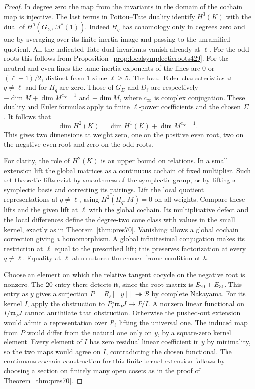 \documentclass[a4paper,11pt]{article}
\theoremstyle{definition}
\theoremstyle{remark}
\numberwithin{equation}{section}
\begin{document}
\begin{proof}
In degree zero the map from the invariants in the domain of the
cochain map is injective. The last terms in Poitou--Tate duality
identify \(H^3(K)\) with the dual of \(H^0(G_\Sigma,M^*(1))\).
Indeed \(H_q\) has cohomology only in degrees zero and one by
averaging over its finite inertia image and passing to the
unramified quotient. All the indicated Tate-dual invariants vanish
already at \(\ell\). For the odd roots this follows from
Proposition~\ref{prop:localsymplecticroots429}. For the neutral
and even lines the tame inertia exponents of the lines are \(0\)
or \((\ell-1)/2\), distinct from \(1\) since \(\ell\ge5\).
The local Euler characteristics at \(q\ne\ell\) and for \(H_q\)
are zero. Those of \(G_\Sigma\) and \(D_\ell\) are respectively
\(-\dim M+\dim M^{c_\infty=1}\) and \(-\dim M\), where
\(c_\infty\) is complex conjugation. These duality and Euler
formulas apply to finite \(\ell\)-power coefficients and the
chosen \(\Sigma\) \cite{IX-VII-V-milne98}. It follows that
\[
             \dim H^2(K)=\dim H^1(K)+\dim M^{c_\infty=1}.
\]
This gives two dimensions at weight zero, one on the positive
even root, two on the negative even root and zero on the odd roots.

For clarity, the role of \(H^2(K)\) is an upper bound on relations.
In a small extension lift the global matrices as a continuous
cochain of fixed multiplier. Such set-theoretic lifts exist by
smoothness of the symplectic group, or by lifting a symplectic
basis and correcting its pairings. Lift the local quotient
representations at \(q\ne\ell\), using \(H^2(H_q,M)=0\) on all
weights. Compare these lifts and the given lift at \(\ell\) with
the global cochain. Its multiplicative defect and the local
differences define the degree-two cone class with values in the
small kernel, exactly as in Theorem~\ref{thm:pres70}. Vanishing
allows a global cochain correction giving a homomorphism. A
global infinitesimal conjugation makes its restriction at \(\ell\)
equal to the prescribed lift; this preserves factorization at
every \(q\ne\ell\). Equality at \(\ell\) also restores the
chosen frame condition at \(h\).

Choose an element on which the relative tangent cocycle on the
negative root is nonzero. The \(20\) entry there detects it,
since the root matrix is \(E_{20}+E_{31}\).
This entry as \(y\) gives a surjection
\(P=R_\ell[[y]]\twoheadrightarrow\mathcal B\) by complete Nakayama.
For its kernel \(I\), apply the obstruction to
\(P/\mathfrak m_P I\to P/I\). A nonzero linear functional on
\(I/\mathfrak m_P I\) cannot annihilate that obstruction. Otherwise
the pushed-out extension would admit a representation over \(R_\ell\)
lifting the universal one. The induced map from \(P\) would differ
from the natural one only on \(y\), by a square-zero kernel
element. Every element of \(I\) has zero residual linear
coefficient in \(y\) by minimality, so the two maps would agree
on \(I\), contradicting the chosen functional. The continuous
cochain construction for this finite-kernel extension follows by
choosing a section on finitely many open cosets as in the proof of
Theorem~\ref{thm:pres70}.


\end{proof}
\end{document}
